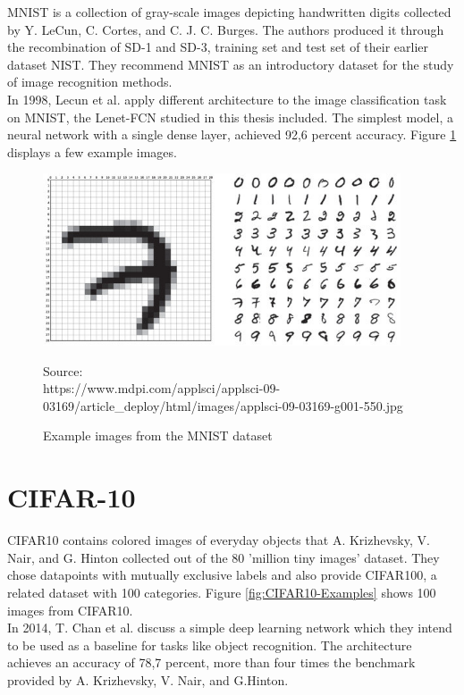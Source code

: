 MNIST is a collection of gray-scale images depicting handwritten digits collected by Y. LeCun, C. Cortes, and C. J. C. Burges. The authors produced it through the recombination of SD-1 and SD-3, training set and test set of their earlier dataset NIST. They recommend MNIST as an introductory dataset for the study of image recognition methods\cite{MNIST}.\\
In 1998, Lecun et al. apply different architecture to the image classification task on MNIST, the Lenet-FCN studied in this thesis included. The simplest model, a neural network with a single dense layer, achieved 92,6 percent accuracy.\cite{lecun1998gradient}
Figure \ref{fig:MNIST-Examples} displays a few example images.
\begin{figure}
	\centering
	\includegraphics[width=400px]{gfx/6-Datasets/MNIST_examples_clean.jpg}
	\caption{Example images from the MNIST dataset}
	\vspace{7pt}
	\footnotesize{
		Source:\\
		https://www.mdpi.com/applsci/applsci-09-03169/article\_deploy/html/images/applsci-09-03169-g001-550.jpg
	}
	\label{fig:MNIST-Examples}
\end{figure}

\section{CIFAR-10}
CIFAR10 contains colored images of everyday objects that A. Krizhevsky, V. Nair, and G. Hinton collected out of the 80 'million tiny images' dataset. They chose datapoints with mutually exclusive labels and also provide CIFAR100, a related dataset with 100 categories. Figure \ref{fig:CIFAR10-Examples} shows 100 images from CIFAR10. \cite{CIFAR}\\
In 2014, T. Chan et al. discuss a simple deep learning network which they intend to be used as a baseline for tasks like object recognition. The architecture achieves an accuracy of 78,7 percent, more than four times the benchmark provided by A. Krizhevsky, V. Nair, and G.Hinton.\cite{CIFAR-Baseline}

